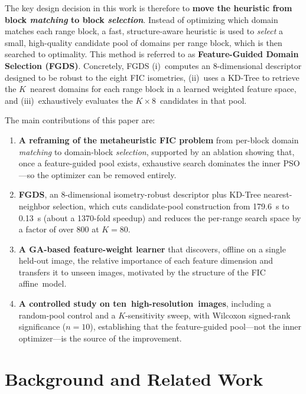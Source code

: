 \documentclass[conference, a4paper]{IEEEtran}
\begin{document}
The key design decision in this work is therefore to \textbf{move the heuristic from block \emph{matching} to block \emph{selection}}. Instead of optimizing which domain matches each range block, a fast, structure-aware heuristic is used to \emph{select} a small, high-quality candidate pool of domains per range block, which is then searched to optimality. This method is referred to as \textbf{Feature-Guided Domain Selection (FGDS)}. Concretely, FGDS (i)~computes an 8-dimensional descriptor designed to be robust to the eight FIC isometries, (ii)~uses a KD-Tree to retrieve the \mbox{$K$}~nearest domains for each range block in a learned weighted feature space, and (iii)~exhaustively evaluates the \mbox{$K\!\times\!8$}~candidates in that pool.

The main contributions of this paper are:
\begin{enumerate}
    \item \textbf{A reframing of the metaheuristic FIC problem} from per-block domain \emph{matching} to domain-block \emph{selection}, supported by an ablation showing that, once a feature-guided pool exists, exhaustive search dominates the inner PSO---so the optimizer can be removed entirely.
    \item \textbf{FGDS}, an 8-dimensional isometry-robust descriptor plus KD-Tree nearest-neighbor selection, which cuts candidate-pool construction from 179.6~s to 0.13~s (about a 1370-fold speedup) and reduces the per-range search space by a factor of over 800 at \mbox{$K\!=\!80$}.
    \item \textbf{A GA-based feature-weight learner} that discovers, offline on a single held-out image, the relative importance of each feature dimension and transfers it to unseen images, motivated by the structure of the FIC affine~model.
    \item \textbf{A controlled study on ten~high-resolution~images}, including a random-pool control and a \mbox{$K$-sensitivity} sweep, with Wilcoxon signed-rank significance (\mbox{$n = 10$}), establishing that the feature-guided pool---not the inner optimizer---is the source of the improvement.
\end{enumerate}


\section{Background and Related Work}
\end{document}
